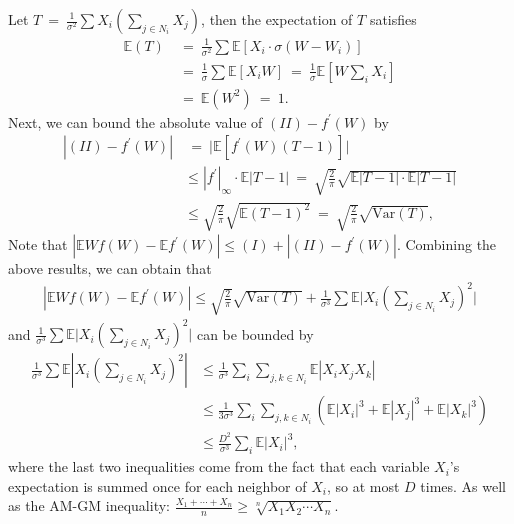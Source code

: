 \documentclass[12pt]{article}
\newcommand{\eq }{\: = \:}
\theoremstyle{nonumberplain}
\begin{document}
Let $T\eq \frac{1}{\sigma ^{2}} \sum X_{i} (\sum_{j\in N_{i}}X_{j})$, then the expectation of $T$ satisfies
\begin{align*}
\mathbb{E}(T)&\eq \frac{1}{\sigma^{2}} \sum \mathbb{E}[X_{i}\cdot \sigma(W-W_{i})]\\
&\eq \frac{1}{\sigma} \sum \mathbb{E}[X_{i}W]\eq \frac{1}{\sigma} \mathbb{E}[W\sum_{i}X_{i}]\\
&\eq \mathbb{E}(W^{2})\eq 1.
\end{align*}
Next, we can bound the absolute value of $(II)-f^{\prime}(W)$ by
\begin{align*}
|(II)-f^{\prime}(W)|&\eq \bigl|\mathbb{E}[f^{\prime}(W)(T-1)]\bigr|\\
&\leq |f^{\prime}|_{\infty}\cdot \mathbb{E}|T-1|\eq \sqrt{\frac{2}{\pi}} \sqrt{\mathbb{E}|T-1|\cdot \mathbb{E}|T-1|}\\
&\leq \sqrt{\frac{2}{\pi}} \sqrt{\mathbb{E}(T-1)^{2}} \eq \sqrt{\frac{2}{\pi}} \sqrt{\mathrm{Var}(T)}, 
\end{align*}
Note that $|\mathbb{E}Wf(W)-\mathbb{E}f^{\prime}(W)|\leq (I)+|(II)-f^{\prime}(W)|$. Combining the above results, we can obtain that
\begin{align*}
|\mathbb{E}Wf(W)-\mathbb{E}f^{\prime}(W)| \leq \sqrt{\frac{2}{\pi}} \sqrt{\mathrm{Var}(T)} + \frac{1}{\sigma ^{3}} \sum \mathbb{E}\bigl|X_{i}(\sum_{j\in N_{i}} X_{j})^{2} \bigr|
\end{align*}
and $\frac{1}{\sigma ^{3}} \sum \mathbb{E}\bigl|X_{i}(\sum_{j\in N_{i}} X_{j})^{2} \bigr|$ can be bounded by
\begin{align*}
\frac{1}{\sigma ^{3}} \sum \mathbb{E}|X_{i}(\sum_{j\in N_{i}} X_{j})^{2}|&\leq \frac{1}{\sigma ^{3}} \sum_{i} \sum_{j,k\in N_{i}} \mathbb{E}|X_{i}X_{j}X_{k}|\\
&\leq \frac{1}{3\sigma ^{3}} \sum_{i} \sum_{j,k\in N_{i}} (\mathbb{E}|X_{i}|^{3}+\mathbb{E}|X_{j}|^{3}+\mathbb{E}|X_{k}|^{3})\\
&\leq \frac{D^{2}}{\sigma ^{3}} \sum_{i} \mathbb{E}|X_{i}|^{3},
\end{align*}
where the last two inequalities come from the fact that each variable $X_i$'s expectation is summed once for each neighbor of $X_i$, so at most $D$ times. As well as the AM-GM inequality: $\frac{X_{1}+\cdots+X_{n}}{n}\geq \sqrt[n]{X_{1}X_{2}\cdots X_{n}}$.
\end{document}
